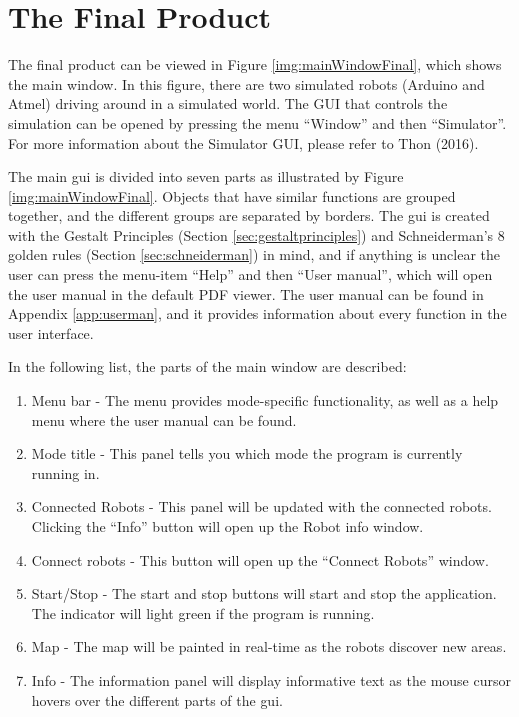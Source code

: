 \section{The Final Product}
\label{secr:finprodgui}
The final product can be viewed in Figure \ref{img:mainWindowFinal}, which shows the main window. In this figure, there are two simulated robots (Arduino and Atmel) driving around in a simulated world. The GUI that controls the simulation can be opened by pressing the menu ``Window'' and then ``Simulator''. For more information about the Simulator GUI, please refer to Thon (2016).


The main \acrshort{gui} is divided into seven parts as illustrated by Figure \ref{img:mainWindowFinal}. Objects that have similar functions are grouped together, and the different groups are separated by borders. The \acrshort{gui} is created with the Gestalt Principles (Section \ref{sec:gestaltprinciples}) and Schneiderman's 8 golden rules (Section \ref{sec:schneiderman}) in mind, and if anything is unclear the user can press the menu-item ``Help'' and then ``User manual'', which will open the user manual in the default PDF viewer. The user manual can be found in Appendix \ref{app:userman}, and it provides information about every function in the user interface.

In the following list, the parts of the main window are described:
\begin{enumerate}
	\item Menu bar - The menu provides mode-specific functionality, as well as a help menu where the user manual can be found.
    \item Mode title - This panel tells you which mode the program is currently running in.
    \item Connected Robots - This panel will be updated with the connected robots. Clicking the ``Info'' button will open up the Robot info window.
    \item Connect robots - This button will open up the ``Connect Robots'' window.
    \item Start/Stop - The start and stop buttons will start and stop the application. The indicator will light green if the program is running.
    \item Map - The map will be painted in real-time as the robots discover new areas.
    \item Info - The information panel will display informative text as the mouse cursor hovers over the different parts of the \acrshort{gui}.
\end{enumerate}

